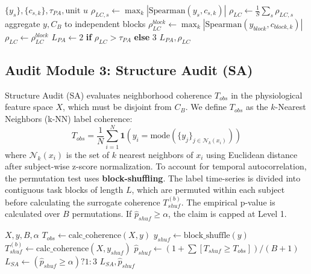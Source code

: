 \documentclass[journal]{IEEEtran}
\begin{document}
\begin{algorithm}[t]
\caption{Proxy Audit (PA)}
\label{alg:pa}
\begin{algorithmic}[1]
\REQUIRE $\{y_s\}, \{c_{s,k}\}, \tau_{PA}, \text{unit } u$ 
        \STATE $\rho_{LC,s} \gets \max_k |\text{Spearman}(y_s, c_{s,k})|$
    \ENDFOR
    \STATE $\rho_{LC} \gets \frac{1}{S}\sum_s \rho_{LC,s}$
    \STATE aggregate $y, C_B$ to independent blocks
    \STATE $\rho^{block}_{LC} \gets \max_k |\text{Spearman}(y_{block}, c_{block,k})|$
    \STATE $\rho_{LC} \gets \rho^{block}_{LC}$
\ENDIF
\STATE $L_{PA} \gets 2$ \textbf{if} $\rho_{LC} > \tau_{PA}$ \textbf{else} $3$
\RETURN $L_{PA}, \rho_{LC}$
\end{algorithmic}
\end{algorithm}

\FloatBarrier
\subsection{Audit Module 3: Structure Audit (SA)}
Structure Audit (SA) evaluates neighborhood coherence $T_{obs}$ in the physiological feature space $X$, which must be disjoint from $C_B$. We define $T_{obs}$ as the $k$-Nearest Neighbors (k-NN) label coherence:
\begin{equation}
T_{obs} = \frac{1}{N} \sum_{i=1}^{N} \mathbf{1}\left(y_i = \text{mode}(\{y_j\}_{j \in \mathcal{N}_k(x_i)})\right)
\end{equation}
where $\mathcal{N}_k(x_i)$ is the set of $k$ nearest neighbors of $x_i$ using Euclidean distance after subject-wise z-score normalization. To account for temporal autocorrelation, the permutation test uses \textbf{block-shuffling}. The label time-series is divided into contiguous task blocks of length $L$, which are permuted within each subject before calculating the surrogate coherence $T_{shuf}^{(b)}$. The empirical p-value is calculated over $B$ permutations. If $\hat{p}_{shuf} \ge \alpha$, the claim is capped at Level 1.

\begin{algorithm}
\caption{Structure Audit (SA)}
\begin{algorithmic}[1]
\REQUIRE $X, y, B, \alpha$
\STATE $T_{obs} \gets \text{calc\_coherence}(X, y)$
    \STATE $y_{shuf} \gets \text{block\_shuffle}(y)$
    \STATE $T_{shuf}^{(b)} \gets \text{calc\_coherence}(X, y_{shuf})$
\ENDFOR
\STATE $\hat{p}_{shuf} \gets (1 + \sum [T_{shuf} \ge T_{obs}]) / (B+1)$
\STATE $L_{SA} \gets (\hat{p}_{shuf} \ge \alpha) ? 1 : 3$
\RETURN $L_{SA}, \hat{p}_{shuf}$
\end{algorithmic}
\end{algorithm}
\end{document}
